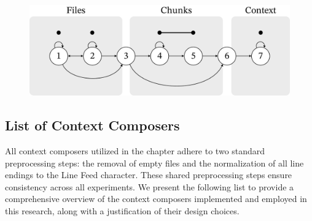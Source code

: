 \begin{figure}[ht]
    \centering
    \includegraphics[width=\textwidth]{figures/composer-blocks.pdf}
    \label{fig:composer-blocks}
\end{figure}

\subsection{List of Context Composers}\label{sec:context-composers-list}

\begin{sloppypar}
All context composers utilized in the  chapter adhere to two standard preprocessing steps: the removal of empty files and the normalization of all line endings to the Line Feed character. These shared preprocessing steps ensure consistency across all experiments. We present the following list to provide a comprehensive overview of the context composers implemented and employed in this research, along with a justification of their design choices.
\end{sloppypar}

